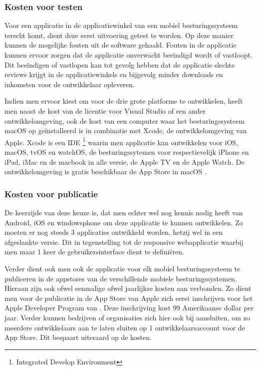 \subsubsection{Kosten voor testen}
Voor een applicatie in de applicatiewinkel van een mobiel besturingssysteem terecht komt, dient deze eerst uitvoering getest te
worden. Op deze manier kunnen de mogelijke fouten uit de software gehaald. Fouten in de applicatie kunnen ervoor zorgen dat de applicatie
onverwacht beeïndigd wordt of vastloopt.
Dit beeïndigen of vastlopen kan tot gevolg hebben dat de applicatie slechte reviews krijgt in de applicatiewinkels en bijgevolg minder downloads en inkomsten voor de ontwikkelaar opleveren.

Indien men ervoor kiest om voor de drie grote platforme te ontwikkelen, heeft men naast de kost van de licentie voor Visual Studio of een ander ontwikkelomgeving,
ook de kost van een computer waar het besturingssysteem macOS op geïnstalleerd is in combinatie met Xcode, de ontwikkelomgeving van Apple.
Xcode is een IDE \footnote{Integrated Develop Environment} waarin men applicatie kan ontwikkelen voor iOS, macOS, tvOS en watchOS, de besturingssytemen voor respectievelijk iPhone en iPad,
iMac en de macbook in alle versie, de Apple TV en de Apple Watch. De ontwikkelomgeving is gratis beschikbaar de App Store in macOS \cite{xcodeindemacappstore2017}.

\subsubsection{Kosten voor publicatie}
De keerzijde van deze keuze is, dat men echter wel nog kennis nodig heeft van Android, iOS en windowsphone om deze applicatie te
kunnen ontwikkelen. Zo moeten er nog steeds 3 applicaties ontwikkeld worden, hetzij wel in een afgeslankte versie.
Dit in tegenstelling tot de responsive webapplicatie waarbij men maar 1 keer de gebruikersinterface dient te definiëren.

Verder dient ook men ook de applicatie voor elk mobiel besturingssysteem te publiceren in de appstores van de verschillende
mobiele besturingssystemen. Hieraan zijn ook ofwel eenmalige ofwel jaarlijkse kosten aan verbonden. Zo dient men voor de publicatie in de App Store van Apple zich eerst inschrijven voor het
Apple Developer Program van \cite{appledeveloperprograms2017} . Deze inschrijving kost 99 Amerikaanse dollar per jaar. Verder kunnen bedrijven of organisaties
zich hier ook bij aansluiten, om zo meerdere ontwikkelaars aan te laten sluiten op 1 ontwikkelaarsaccount voor de App Store.
Dit bespaart uiteraard op de kosten.

